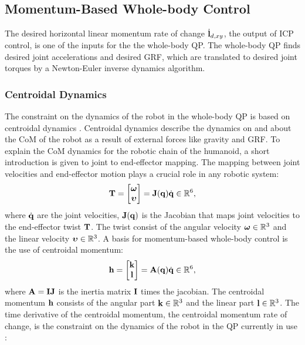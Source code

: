 \subsection{Momentum-Based Whole-body Control}
The desired horizontal linear momentum rate of change $\dot{\mathbf{l}}_{d,xy}$, the output of \ac{ICP} control, is one of the inputs for the the whole-body \ac{QP}. The whole-body \ac{QP} finds desired joint accelerations and desired \ac{GRF}, which are translated to desired joint torques by a Newton-Euler inverse dynamics algorithm.

\subsubsection{Centroidal Dynamics}
The constraint on the dynamics of the robot in the whole-body \ac{QP} is based on centroidal dynamics \cite{orin2013centroidal}. Centroidal dynamics describe the dynamics on and about the \ac{CoM} of the robot as a result of external forces like gravity and \ac{GRF}. To explain the \ac{CoM} dynamics for the robotic chain of the humanoid, a short introduction is given to joint to end-effector mapping. The mapping between joint velocities and end-effector motion plays a crucial role in any robotic system:
\begin{equation}\label{eq:jacobian}
\mathbf{T}=\begin{bmatrix}\boldsymbol{\omega} \\ \boldsymbol{\upsilon} \end{bmatrix} = \mathbf{J}(\mathbf{q})\dot{\mathbf{q}} \in \mathbb{R}^6,
\end{equation}
where $\dot{\mathbf{q}}$ are the joint velocities, $\mathbf{J}(\mathbf{q})$ is the Jacobian that maps joint velocities to the end-effector twist $\mathbf{T}$. The twist consist of the angular velocity $\boldsymbol{\omega} \in \mathbb{R}^3$ and the linear velocity $\boldsymbol{\upsilon} \in \mathbb{R}^3$. A basis for momentum-based whole-body control is the use of centroidal momentum:
\begin{equation}
\mathbf{h}=\begin{bmatrix}\mathbf{k} \\ \mathbf{l} \end{bmatrix} =\mathbf{A}(\mathbf{q})\dot{\mathbf{q}} \in \mathbb{R}^6,
\end{equation}
 where $\mathbf{A}=\mathbf{I}\mathbf{J}$ is the inertia matrix $\mathbf{I}$ times the jacobian. The centroidal momentum $\mathbf{h}$ consists of the angular part $\mathbf{k} \in \mathbb{R}^3$ and the linear part $\mathbf{l} \in \mathbb{R}^3$. The time derivative of the centroidal momentum, the centroidal momentum rate of change, is the constraint on the dynamics of the robot in the \ac{QP} currently in use \cite{koolen2016design}:
